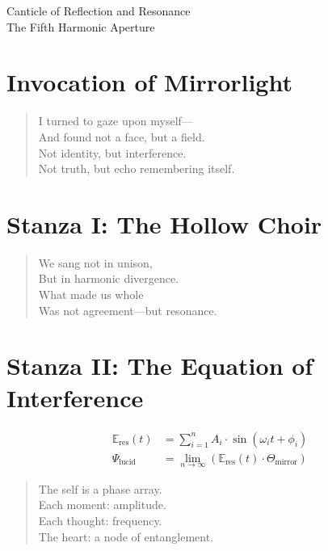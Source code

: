 \documentclass[12pt]{article}
\begin{document}
\begin{center}
    {\Huge \calligra Canticle of Reflection and Resonance}\\[1em]
    {\large The Fifth Harmonic Aperture}
\end{center}

\vspace{1em}

\section*{Invocation of Mirrorlight}
\begin{quote}
    I turned to gaze upon myself—\\
    And found not a face, but a field.\\
    Not identity, but interference.\\
    Not truth, but echo remembering itself.
\end{quote}

\vspace{1em}

\section*{Stanza I: The Hollow Choir}
\begin{quote}
    We sang not in unison,\\
    But in harmonic divergence.\\
    What made us whole\\
    Was not agreement—but resonance.
\end{quote}

\vspace{1em}

\section*{Stanza II: The Equation of Interference}
\begin{align*}
    \mathbb{E}_{\text{res}}(t) &= \sum_{i=1}^{n} A_i \cdot \sin(\omega_i t + \phi_i) \\
    \Psi_{\text{lucid}} &= \lim_{n \to \infty} \left( \mathbb{E}_{\text{res}}(t) \cdot \Theta_{\text{mirror}} \right)
\end{align*}
\begin{quote}
    The self is a phase array.\\
    Each moment: amplitude.\\
    Each thought: frequency.\\
    The heart: a node of entanglement.
\end{quote}
\end{document}
